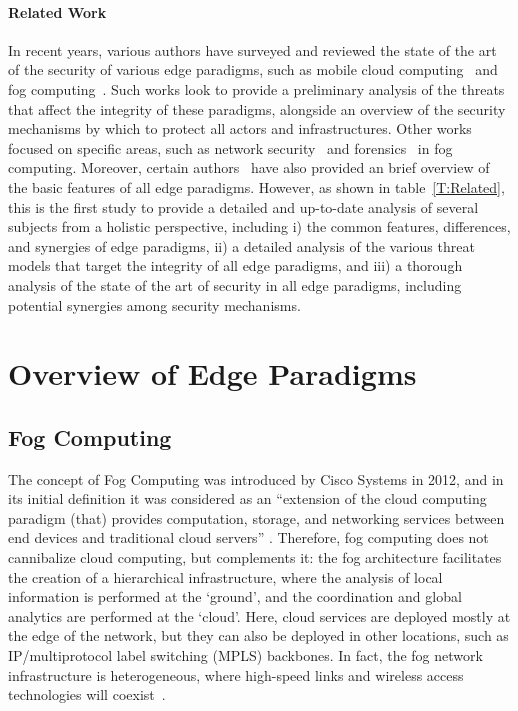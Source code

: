 \documentclass[twocolumn,preprint,3p]{elsarticle}
\begin{document}
\paragraph{Related Work} In recent years, various authors have surveyed and reviewed the state of the art of the security of various edge paradigms, such as mobile cloud computing~\cite{OPENiD23,Suo13,Hassan15} and fog computing~\cite{StojmenovicFSec05,Kanghyo15,Shanhe15}. Such works look to provide a preliminary analysis of the threats that affect the integrity of these paradigms, alongside an overview of the security mechanisms by which to protect all actors and infrastructures. Other works focused on specific areas, such as network security~\cite{Stojmenovic14} and forensics~\cite{WangF15} in fog computing. Moreover, certain authors~\cite{Yucianga15} have also provided an brief overview of the basic features of all edge paradigms. However, as shown in table~\ref{T:Related}, this is the first study to provide a detailed and up-to-date analysis of several subjects from a holistic perspective, including i) the common features, differences, and synergies of edge paradigms, ii) a detailed analysis of the various threat models that target the integrity of all edge paradigms, and iii) a thorough analysis of the state of the art of security in all edge paradigms, including potential synergies among security mechanisms.



\section{Overview of Edge Paradigms}
\label{overview}

\subsection{Fog Computing}
\label{overview:fog}

The concept of Fog Computing was introduced by Cisco Systems in 2012, and in its initial definition it was considered as an ``extension of the cloud computing paradigm (that) provides computation, storage, and networking services between end devices and traditional cloud servers'' \cite{Bonomi12}. Therefore, fog computing does not cannibalize cloud computing, but complements it: the fog architecture facilitates the creation of a hierarchical infrastructure, where the analysis of local information is performed at the `ground', and the coordination and global analytics are performed at the `cloud'. Here, cloud services are deployed mostly at the edge of the network, but they can also be deployed in other locations, such as IP/multiprotocol label switching (MPLS) backbones. In fact, the fog network infrastructure is heterogeneous, where high-speed links and wireless access technologies will coexist~\cite{Bonomi14}.
\end{document}
